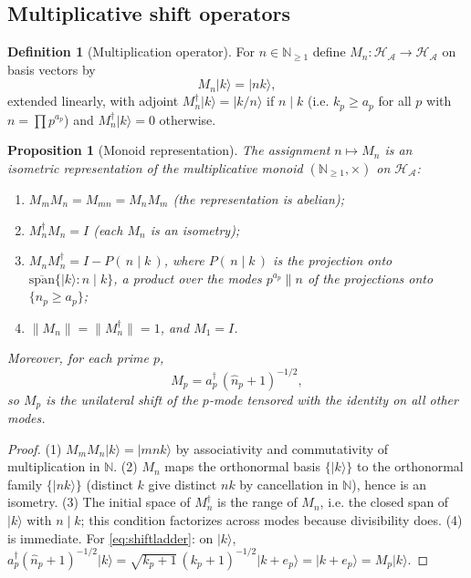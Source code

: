 \documentclass[11pt,a4paper]{article}
\theoremstyle{plain}
\newtheorem{proposition}[theorem]{Proposition}
\theoremstyle{definition}
\newtheorem{definition}[theorem]{Definition}
\theoremstyle{remark}
\newcommand{\ket}[1]{\lvert #1\rangle}
\newcommand{\Nn}{\mathbb{N}}
\newcommand{\Hil}{\mathcal{H}}
\begin{document}
\subsection{Multiplicative shift operators}

\begin{definition}[Multiplication operator]\label{def:multiplication}
For $n\in\Nn_{\geq1}$ define $M_{n}\colon\Hil_{\mathcal{A}}\to\Hil_{\mathcal{A}}$ on basis
vectors by
\begin{equation}
M_{n}\ket{k}=\ket{nk},
\end{equation}
extended linearly, with adjoint $M_{n}^{\dagger}\ket{k}=\ket{k/n}$ if $n\mid k$ (i.e.
$k_{p}\geq a_{p}$ for all $p$ with $n=\prod p^{a_{p}}$) and $M_{n}^{\dagger}\ket{k}=0$
otherwise.
\end{definition}

\begin{proposition}[Monoid representation]\label{prop:monoidrep}
The assignment $n\mapsto M_{n}$ is an isometric representation of the multiplicative monoid
$(\Nn_{\geq1},\times)$ on $\Hil_{\mathcal{A}}$:
\begin{enumerate}[leftmargin=1.6em]
\item $M_{m}M_{n}=M_{mn}=M_{n}M_{m}$ (the representation is abelian);
\item $M_{n}^{\dagger}M_{n}=I$ (each $M_{n}$ is an isometry);
\item $M_{n}M_{n}^{\dagger}=I-P(\,n\mid k\,)$, where $P(\,n\mid k\,)$ is the projection onto
$\overline{\mathrm{span}}\{\ket{k}: n\mid k\}$, a product over the modes $p^{a_{p}}\| n$ of
the projections onto $\{\hat n_{p}\geq a_{p}\}$;
\item $\|M_{n}\|=\|M_{n}^{\dagger}\|=1$, and $M_{1}=I$.
\end{enumerate}
Moreover, for each prime $p$,
\begin{equation}\label{eq:shiftladder}
M_{p}=a_{p}^{\dagger}\,(\hat n_{p}+1)^{-1/2},
\end{equation}
so $M_{p}$ is the \emph{unilateral shift} of the $p$-mode tensored with the identity on all
other modes.
\end{proposition}

\begin{proof}
(1) $M_{m}M_{n}\ket{k}=\ket{mnk}$ by associativity and commutativity of multiplication in
$\Nn$. (2) $M_{n}$ maps the orthonormal basis $\{\ket{k}\}$ to the orthonormal family
$\{\ket{nk}\}$ (distinct $k$ give distinct $nk$ by cancellation in $\Nn$), hence is an
isometry. (3) The initial space of $M_{n}^{\dagger}$ is the range of $M_{n}$, i.e. the closed
span of $\ket{k}$ with $n\mid k$; this condition factorizes across modes because divisibility
does. (4) is immediate. For \eqref{eq:shiftladder}: on $\ket{k}$,
$a_{p}^{\dagger}(\hat n_{p}+1)^{-1/2}\ket{k}=\sqrt{k_{p}+1}\,(k_{p}+1)^{-1/2}\ket{k+e_{p}}
=\ket{k+e_{p}}=M_{p}\ket{k}$.
\end{proof}
\end{document}
